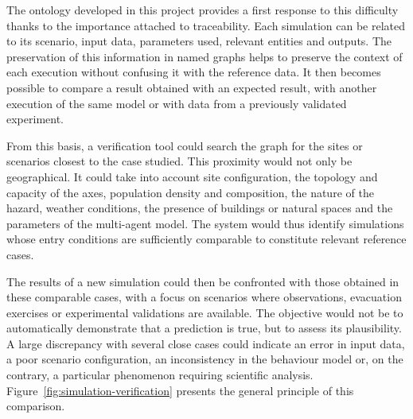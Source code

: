 \documentclass{article}
\begin{document}
The ontology developed in this project provides a first response to this difficulty thanks to the importance attached to traceability. Each simulation can be related to its scenario, input data, parameters used, relevant entities and outputs. The preservation of this information in named graphs helps to preserve the context of each execution without confusing it with the reference data. It then becomes possible to compare a result obtained with an expected result, with another execution of the same model or with data from a previously validated experiment.

From this basis, a verification tool could search the graph for the sites or scenarios closest to the case studied. This proximity would not only be geographical. It could take into account site configuration, the topology and capacity of the axes, population density and composition, the nature of the hazard, weather conditions, the presence of buildings or natural spaces and the parameters of the multi-agent model. The system would thus identify simulations whose entry conditions are sufficiently comparable to constitute relevant reference cases.

The results of a new simulation could then be confronted with those obtained in these comparable cases, with a focus on scenarios where observations, evacuation exercises or experimental validations are available. The objective would not be to automatically demonstrate that a prediction is true, but to assess its plausibility. A large discrepancy with several close cases could indicate an error in input data, a poor scenario configuration, an inconsistency in the behaviour model or, on the contrary, a particular phenomenon requiring scientific analysis. Figure~\ref{fig:simulation-verification} presents the general principle of this comparison.
\end{document}
